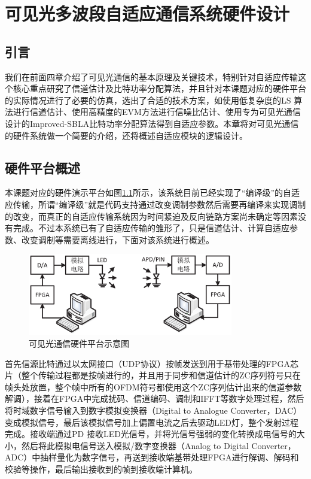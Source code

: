 \chapter{可见光多波段自适应通信系统硬件设计}
\section{引言}
我们在前面四章介绍了可见光通信的基本原理及关键技术，特别针对自适应传输这个核心重点研究了信道估计及比特功率分配算法，并且针对本课题对应的硬件平台的实际情况进行了必要的仿真，选出了合适的技术方案，如使用低复杂度的LS 算法进行信道估计、使用高精度的EVM方法进行信噪比估计、使用专为可见光通信设计的Improved-SBLA比特功率分配算法得到自适应参数。本章将对可见光通信的硬件系统做一个简要的介绍，还将概述自适应模块的逻辑设计。
\section{硬件平台概述}
本课题对应的硬件演示平台如图\ref{fig:Hardware_Structure}所示，该系统目前已经实现了“编译级”的自适应传输，所谓“编译级”就是代码支持通过改变调制参数然后需要再编译来实现调制的改变，而真正的自适应传输系统因为时间紧迫及反向链路方案尚未确定等因素没有完成。不过本系统已有了自适应传输的雏形了，只是信道估计、计算自适应参数、改变调制等需要离线进行，下面对该系统进行概述。
\begin{figure}[htbp]
\centering
\includegraphics[width=0.8\textwidth]{figures/chapter-5/Hardware_Structure.eps}
\caption{可见光通信硬件平台示意图}
\label{fig:Hardware_Structure}
\end{figure}

首先信源比特通过以太网接口（UDP协议）按帧发送到用于基带处理的FPGA芯片（整个传输过程都是按帧进行的，并且用于同步和信道估计的ZC序列符号只在帧头处放置，整个帧中所有的OFDM符号都使用这个ZC序列估计出来的信道参数解调），接着在FPGA中完成扰码、信道编码、调制和IFFT等数字处理过程，然后将时域数字信号输入到数字模拟变换器（Digital to Analogue Converter，DAC）变成模拟信号，最后该模拟信号加上偏置电流之后去驱动LED灯，整个发射过程完成。接收端通过PD 接收LED光信号，并将光信号强弱的变化转换成电信号的大小，然后将此模拟电信号送入模拟/数字变换器（Analog to Digital Converter，ADC）中抽样量化为数字信号，再送到接收端基带处理FPGA进行解调、解码和校验等操作，最后输出接收到的帧到接收端计算机。
